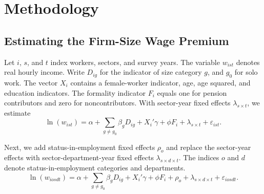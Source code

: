 \section{Methodology}
\label{sec:methodology}

\subsection{Estimating the Firm-Size Wage Premium}
\label{subsec:preferred-specification}


Let \(i\), \(s\), and \(t\) index workers, sectors, and survey years.
The variable \(w_{ist}\) denotes real hourly income.
Write \(D_{ig}\) for the indicator of size category \(g\), and \(g_0\) for
solo work. The vector \(X_i\) contains a female-worker indicator, age,
age squared, and education indicators. The formality indicator \(F_i\) equals one for pension
contributors and zero for noncontributors. With sector-year fixed effects
\(\lambda_{s\times t}\), we estimate
\begin{equation}\label{eq:common-premium}
  \ln(w_{ist}) = \alpha
  + \sum_{g\neq g_0} \beta_g D_{ig}
  + X_i'\gamma + \phi F_i
  + \lambda_{s\times t}+\varepsilon_{ist}.
\end{equation}

Next, we add status-in-employment fixed effects \(\rho_o\) and replace
the sector-year effects with sector-department-year fixed effects
\(\lambda_{s\times d\times t}\). The indices \(o\) and \(d\) denote
status-in-employment categories and departments.
\begin{equation}\label{eq:common-premium-geography}
  \ln(w_{iosdt}) = \alpha
  + \sum_{g\neq g_0} \beta_g D_{ig}
  + X_i'\gamma + \phi F_i
  + \rho_o + \lambda_{s\times d\times t}
  + \varepsilon_{iosdt}.
\end{equation}

